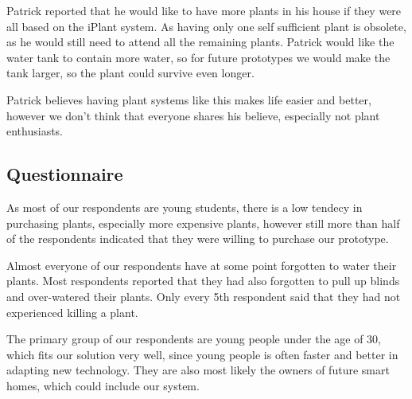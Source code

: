 \documentclass{ubicomp2012}
\begin{document}
Patrick reported that he would like to have more plants in his house if they were all based on the iPlant system. As having only one self sufficient plant is obsolete, as he would still need to attend all the remaining plants.
Patrick would like the water tank to contain more water, so for future prototypes we would make the tank larger, so the plant could survive even longer.

Patrick believes having plant systems like this makes life easier and better, however we don't think that everyone shares his believe, especially not plant enthusiasts.






\subsection{Questionnaire}
As most of our respondents are young students, there is a low tendecy in purchasing plants, especially more expensive plants, however still more than half of the respondents indicated that they were willing to purchase our prototype.

Almost everyone of our respondents have at some point forgotten to water their plants. Most respondents reported that they had also forgotten to pull up blinds and over-watered their plants. Only every 5th respondent said that they had not experienced killing a plant.

The primary group of our respondents are young people under the age of 30, which fits our solution very well, since young people is often faster and better in adapting new technology. They are also most likely the owners of future smart homes, which could include our system.
\end{document}
